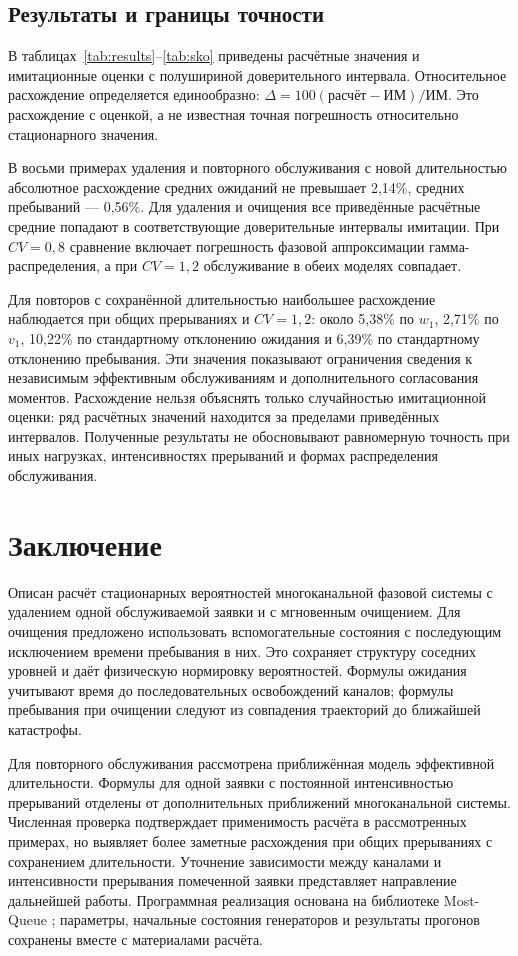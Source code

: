 \documentclass[a4paper,12pt]{article}
\begin{document}
\subsection{Результаты и границы точности}
В таблицах~\ref{tab:results}--\ref{tab:sko} приведены расчётные значения и имитационные оценки с полушириной доверительного интервала. Относительное расхождение определяется единообразно: \(\Delta=100(\text{расчёт}-\text{ИМ})/\text{ИМ}.\) Это расхождение с оценкой, а не известная точная погрешность относительно стационарного значения.

В восьми примерах удаления и повторного обслуживания с новой длительностью абсолютное расхождение средних ожиданий не превышает 2{,}14\%, средних пребываний --- 0{,}56\%. Для удаления и очищения все приведённые расчётные средние попадают в соответствующие доверительные интервалы имитации. При \(CV=0{,}8\) сравнение включает погрешность фазовой аппроксимации гамма-распределения, а при \(CV=1{,}2\) обслуживание в обеих моделях совпадает.



Для повторов с сохранённой длительностью наибольшее расхождение наблюдается при общих прерываниях и \(CV=1{,}2\): около 5{,}38\% по \(w_1\), 2{,}71\% по \(v_1\), 10{,}22\% по стандартному отклонению ожидания и 6{,}39\% по стандартному отклонению пребывания. Эти значения показывают ограничения сведения к независимым эффективным обслуживаниям и дополнительного согласования моментов. Расхождение нельзя объяснять только случайностью имитационной оценки: ряд расчётных значений находится за пределами приведённых интервалов. Полученные результаты не обосновывают равномерную точность при иных нагрузках, интенсивностях прерываний и формах распределения обслуживания.

\FloatBarrier
\section{Заключение}
Описан расчёт стационарных вероятностей многоканальной фазовой системы с удалением одной обслуживаемой заявки и с мгновенным очищением. Для очищения предложено использовать вспомогательные состояния с последующим исключением времени пребывания в них. Это сохраняет структуру соседних уровней и даёт физическую нормировку вероятностей. Формулы ожидания учитывают время до последовательных освобождений каналов; формулы пребывания при очищении следуют из совпадения траекторий до ближайшей катастрофы.

Для повторного обслуживания рассмотрена приближённая модель эффективной длительности. Формулы для одной заявки с постоянной интенсивностью прерываний отделены от дополнительных приближений многоканальной системы. Численная проверка подтверждает применимость расчёта в рассмотренных примерах, но выявляет более заметные расхождения при общих прерываниях с сохранением длительности. Уточнение зависимости между каналами и интенсивности прерывания помеченной заявки представляет направление дальнейшей работы. Программная реализация основана на библиотеке Most-Queue \cite{mostqueue2026}; параметры, начальные состояния генераторов и результаты прогонов сохранены вместе с материалами расчёта.

\printbibliography
\end{document}
